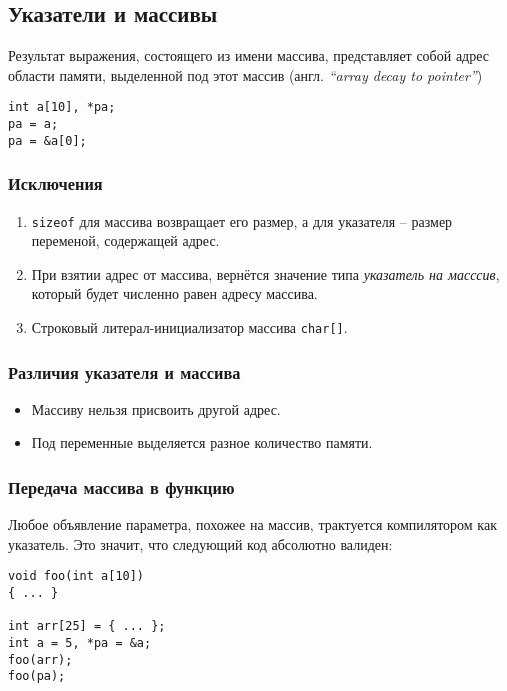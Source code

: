 \subsection{Указатели и массивы}

Результат выражения, состоящего из имени массива, представляет собой адрес области памяти, выделенной под этот массив (англ. \textit{``array decay to pointer''})

\begin{verbatim}
int a[10], *pa;
pa = a;
pa = &a[0];
\end{verbatim}

\subsubsection{Исключения}

\begin{enumerate}
  \item \texttt{sizeof} для массива возвращает его размер, а для указателя -- размер переменой, содержащей адрес.
  \item При взятии адрес от массива, вернётся значение типа \textit{указатель на масссив}, который будет численно равен адресу массива.
  \item Строковый литерал-инициализатор массива \texttt{char[]}.
\end{enumerate}

\subsubsection{Различия указателя и массива}

\begin{itemize}
  \item Массиву нельзя присвоить другой адрес.
  \item Под переменные выделяется разное количество памяти.
\end{itemize}

\subsubsection{Передача массива в функцию}

Любое объявление параметра, похожее на массив, трактуется компилятором как указатель.
Это значит, что следующий код абсолютно валиден:
\begin{verbatim}
void foo(int a[10])
{ ... }

int arr[25] = { ... };
int a = 5, *pa = &a;
foo(arr);
foo(pa);
\end{verbatim}

